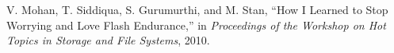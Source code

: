 

\begin{thebibliography}{00}

V. Mohan, T. Siddiqua, S. Gurumurthi, and M. Stan, 
``How I Learned to Stop Worrying and Love Flash Endurance,'' 
in \textit{Proceedings of the Workshop on Hot Topics in Storage and File Systems}, 2010.

\end{thebibliography}
